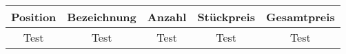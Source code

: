 \documentclass{article}
\begin{document}
\begin{center}
    \begin{tabular}{ c | c | c | c | c }
        \rowcolor{FantappticGreen!50}
        \color{white}Position & \color{white}Bezeichnung & \color{white}Anzahl & \color{white}St\"uckpreis & \color{white}Gesamtpreis \\ [0.25ex] %
        \hline
        Test & Test & Test & Test & Test \\ \hline
    \end{tabular}
\end{center}
\end{document}
